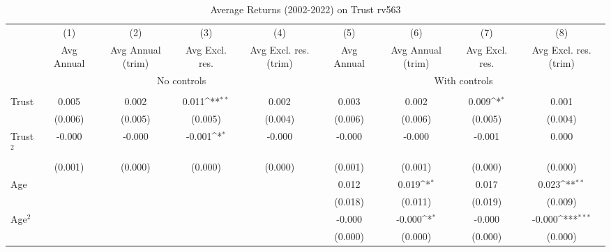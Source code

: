 \begin{table}[htbp]\centering
\def\sym#1{\ifmmode^{#1}\else\(^{#1}\)\fi}
\caption{Average Returns (2002-2022) on Trust rv563}
\begin{tabular}{l*{8}{c}}
\toprule
          &\multicolumn{1}{c}{(1)}&\multicolumn{1}{c}{(2)}&\multicolumn{1}{c}{(3)}&\multicolumn{1}{c}{(4)}&\multicolumn{1}{c}{(5)}&\multicolumn{1}{c}{(6)}&\multicolumn{1}{c}{(7)}&\multicolumn{1}{c}{(8)}\\
          &\multicolumn{1}{c}{Avg Annual}&\multicolumn{1}{c}{Avg Annual (trim)}&\multicolumn{1}{c}{Avg Excl. res.}&\multicolumn{1}{c}{Avg Excl. res. (trim)}&\multicolumn{1}{c}{Avg Annual}&\multicolumn{1}{c}{Avg Annual (trim)}&\multicolumn{1}{c}{Avg Excl. res.}&\multicolumn{1}{c}{Avg Excl. res. (trim)}\\
& \multicolumn{4}{c}{No controls} & \multicolumn{4}{c}{With controls} \\\\ \cmidrule(lr){2-5}\cmidrule(lr){6-9}
Trust     &    0.005         &    0.002         &    0.011\sym{**} &    0.002         &    0.003         &    0.002         &    0.009\sym{*}  &    0.001         \\
          &  (0.006)         &  (0.005)         &  (0.005)         &  (0.004)         &  (0.006)         &  (0.006)         &  (0.005)         &  (0.004)         \\
Trust$^{2}$&   -0.000         &   -0.000         &   -0.001\sym{*}  &   -0.000         &   -0.000         &   -0.000         &   -0.001         &    0.000         \\
          &  (0.001)         &  (0.000)         &  (0.000)         &  (0.000)         &  (0.001)         &  (0.001)         &  (0.000)         &  (0.000)         \\
Age       &                  &                  &                  &                  &    0.012         &    0.019\sym{*}  &    0.017         &    0.023\sym{**} \\
          &                  &                  &                  &                  &  (0.018)         &  (0.011)         &  (0.019)         &  (0.009)         \\
Age$^{2}$ &                  &                  &                  &                  &   -0.000         &   -0.000\sym{*}  &   -0.000         &   -0.000\sym{***}\\
          &                  &                  &                  &                  &  (0.000)         &  (0.000)         &  (0.000)         &  (0.000)         \\

\end{tabular}
\end{table}

